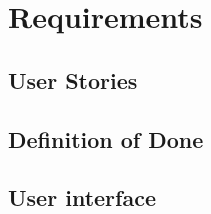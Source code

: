 \section{Requirements}

\subsection{User Stories}
\begin{comment}
Use the template from the course website and list all user stories here. It is
fine to have them in an spreadsheet (or other applications, such as Trello) at
first, but they must end up here as well.

These user stories should describe what the user will be able to do. Write
the user stories in language of the customer, and give them a unique ID. List
the user stories in order of priority.

You need to annotate an user story whether or not it is implemented. We need to
know which user stories are implemented, such that we can check this during the
oral presentation.
\end{comment}

\subsection{Definition of Done}
\begin{comment}
In this section you list the acceptance criteria that are common for all user
stories. For example, the code should reviewed and tests, it should be under
version control, etc.
\end{comment}

\subsection{User interface}
\begin{comment}
Include sketches, drawings and explanations of the application's user interface.
Describe the navigation between the different views.
\end{comment}
